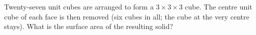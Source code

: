 Twenty-seven unit cubes are arranged to form a $3\times3\times3$ cube. The centre unit cube of each face is then removed (six cubes in all; the cube at the very centre stays). What is the surface area of the resulting solid?
